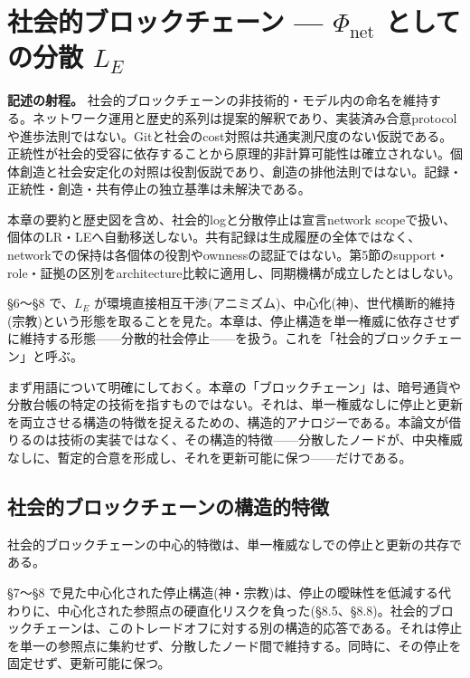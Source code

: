 \section{社会的ブロックチェーン — $\Phi_{\text{net}}$ としての分散 $L_E$}

\noindent\textbf{記述の射程。} 社会的ブロックチェーンの非技術的・モデル内の命名を維持する。ネットワーク運用と歴史的系列は提案的解釈であり、実装済み合意protocolや進歩法則ではない。Gitと社会のcost対照は共通実測尺度のない仮説である。正統性が社会的受容に依存することから原理的非計算可能性は確立されない。個体創造と社会安定化の対照は役割仮説であり、創造の排他法則ではない。記録・正統性・創造・共有停止の独立基準は未解決である。

本章の要約と歴史図を含め、社会的logと分散停止は宣言network scopeで扱い、個体のLR・LEへ自動移送しない。共有記録は生成履歴の全体ではなく、networkでの保持は各個体の役割やownnessの認証ではない。第5節のsupport・role・証拠の区別をarchitecture比較に適用し、同期機構が成立したとはしない。



\S{}6〜\S{}8 で、$L_E$ が環境直接相互干渉(アニミズム)、中心化(神)、世代横断的維持(宗教)という形態を取ることを見た。本章は、停止構造を単一権威に依存させずに維持する形態——分散的社会停止——を扱う。これを「社会的ブロックチェーン」と呼ぶ。

まず用語について明確にしておく。本章の「ブロックチェーン」は、暗号通貨や分散台帳の特定の技術を指すものではない。それは、単一権威なしに停止と更新を両立させる構造の特徴を捉えるための、構造的アナロジーである。本論文が借りるのは技術の実装ではなく、その構造的特徴——分散したノードが、中央権威なしに、暫定的合意を形成し、それを更新可能に保つ——だけである。

\bigskip


\subsection{社会的ブロックチェーンの構造的特徴}


社会的ブロックチェーンの中心的特徴は、単一権威なしでの停止と更新の共存である。

\S{}7〜\S{}8 で見た中心化された停止構造(神・宗教)は、停止の曖昧性を低減する代わりに、中心化された参照点の硬直化リスクを負った(\S{}8.5、\S{}8.8)。社会的ブロックチェーンは、このトレードオフに対する別の構造的応答である。それは停止を単一の参照点に集約せず、分散したノード間で維持する。同時に、その停止を固定せず、更新可能に保つ。


